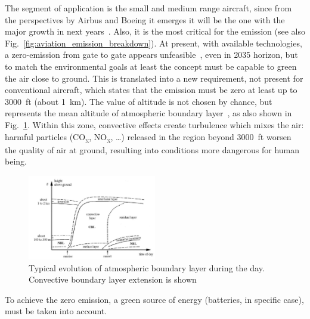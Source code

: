The segment of application is the small and medium range aircraft, since from the perspectives by Airbus and Boeing it emerges it will be the one with the major growth in next years~\cite{bib:airbus_global_market, bib:boeing_outlook_market}. 
Also, it is the most critical for the emission (see also Fig.~\ref{fig:aviation_emission_breakdown}). 
At present, with available technologies, a zero-emission from gate to gate appears unfeasible~\cite{bib:hornung}, even in 2035 horizon, but to match the environmental goals at least the concept must be capable to green the air close to ground. 
This is translated into a new requirement, not present for conventional aircraft, which states that the emission must be zero at least up to 3000~ft (about 1~\si{\kilo\meter}). 
The value of altitude is not chosen by chance, but represents the mean altitude of atmospheric boundary layer~\cite{bib:li}, as also shown in Fig.~\ref{fig:atmo_bl}.
Within this zone, convective effects create turbulence which mixes the air: harmful particles (CO\textsubscript{x}, NO\textsubscript{x}, \dots) released in the region beyond 3000~ft worsen the quality of air at ground, resulting into conditions more dangerous for human being. 
\begin{figure}[!h]
	\centering
	\includegraphics[keepaspectratio, width=0.5\textwidth]{images/chap3/atmospheric_boundary_layer.jpg}
	\caption{Typical evolution of atmospheric boundary layer during the day. Convective boundary layer extension is shown~\cite{bib:li}} 
	\label{fig:atmo_bl}
\end{figure}
To achieve the zero emission, a green source of energy (batteries, in specific case), must be taken into account.  

